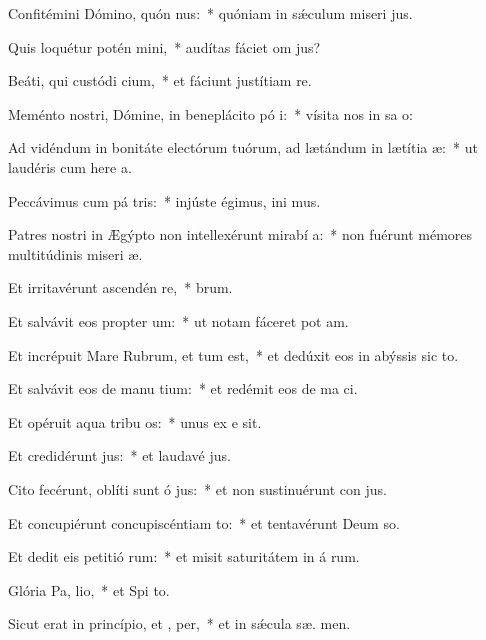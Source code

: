 \item Confitémini Dómino, quón nus:~* quóniam in sǽculum miseri jus.
\item Quis loquétur potén mini,~* audítas fáciet om  jus?
\item Beáti, qui custódi cium,~* et fáciunt justítiam   re.
\item Meménto nostri, Dómine, in beneplácito pó i:~* vísita nos in sa o:
\item Ad vidéndum in bonitáte electórum tuórum, ad lætándum in lætítia  æ:~* ut laudéris cum here a.
\item Peccávimus cum pá tris:~* injúste égimus, ini mus.
\item Patres nostri in Ægýpto non intellexérunt mirabí a:~* non fuérunt mémores multitúdinis miseri æ.
\item Et irritavérunt ascendén  re,~*  brum.
\item Et salvávit eos propter  um:~* ut notam fáceret pot am.
\item Et incrépuit Mare Rubrum, et tum est,~* et dedúxit eos in abýssis sic  to.
\item Et salvávit eos de manu tium:~* et redémit eos de ma ci.
\item Et opéruit aqua tribu os:~* unus ex e  sit.
\item Et credidérunt  jus:~* et laudavé  jus.
\item Cito fecérunt, oblíti sunt ó jus:~* et non sustinuérunt con jus.
\item Et concupiérunt concupiscéntiam  to:~* et tentavérunt Deum  so.
\item Et dedit eis petitió rum:~* et misit saturitátem in á rum.
\item Glória Pa,  lio,~* et Spi to.
\item Sicut erat in princípio, et ,  per,~* et in sǽcula sæ. men.
